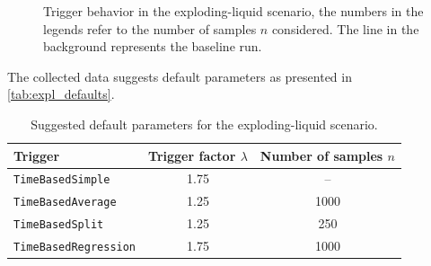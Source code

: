 \begin{figure}[htpb]
\begin{subfigure}{0.45\textwidth}
	\end{subfigure}%
	\hspace{0.05\textwidth}
	\begin{subfigure}{0.45\textwidth}
	\end{subfigure}%
	\caption{Trigger behavior in the exploding-liquid scenario, the numbers in the legends refer to the number of samples $n$ considered. The line in the background represents the baseline run.}
	\label{fig:params_expl}
\end{figure}


The collected data suggests default parameters as presented in \autoref{tab:expl_defaults}.
\begin{table}[htpb]
	\centering
	\begin{tabular}{lcc}
		\toprule
		\textbf{Trigger}             & \textbf{Trigger factor $\lambda$} & \textbf{Number of samples $n$} \\ [0em]
		\midrule
		\texttt{TimeBasedSimple}     & 1.75                              & --                             \\
		\texttt{TimeBasedAverage}    & 1.25                              & 1000                           \\
		\texttt{TimeBasedSplit}      & 1.25                              & 250                            \\
		\texttt{TimeBasedRegression} & 1.75                              & 1000                           \\
		\bottomrule
	\end{tabular}
	\caption{Suggested default parameters for the exploding-liquid scenario.}
	\label{tab:expl_defaults}
\end{table}

